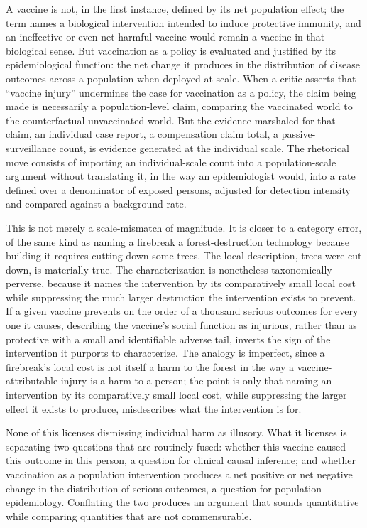 \documentclass[11pt]{article}
\begin{document}
A vaccine is not, in the first instance, defined by its net population effect; the term names a biological intervention intended to induce protective immunity, and an ineffective or even net-harmful vaccine would remain a vaccine in that biological sense. But vaccination as a policy is evaluated and justified by its epidemiological function: the net change it produces in the distribution of disease outcomes across a population when deployed at scale. When a critic asserts that ``vaccine injury'' undermines the case for vaccination as a policy, the claim being made is necessarily a population-level claim, comparing the vaccinated world to the counterfactual unvaccinated world. But the evidence marshaled for that claim, an individual case report, a compensation claim total, a passive-surveillance count, is evidence generated at the individual scale. The rhetorical move consists of importing an individual-scale count into a population-scale argument without translating it, in the way an epidemiologist would, into a rate defined over a denominator of exposed persons, adjusted for detection intensity and compared against a background rate.

This is not merely a scale-mismatch of magnitude. It is closer to a category error, of the same kind as naming a firebreak a forest-destruction technology because building it requires cutting down some trees. The local description, trees were cut down, is materially true. The characterization is nonetheless taxonomically perverse, because it names the intervention by its comparatively small local cost while suppressing the much larger destruction the intervention exists to prevent. If a given vaccine prevents on the order of a thousand serious outcomes for every one it causes, describing the vaccine's social function as injurious, rather than as protective with a small and identifiable adverse tail, inverts the sign of the intervention it purports to characterize. The analogy is imperfect, since a firebreak's local cost is not itself a harm to the forest in the way a vaccine-attributable injury is a harm to a person; the point is only that naming an intervention by its comparatively small local cost, while suppressing the larger effect it exists to produce, misdescribes what the intervention is for.

None of this licenses dismissing individual harm as illusory. What it licenses is separating two questions that are routinely fused: whether this vaccine caused this outcome in this person, a question for clinical causal inference; and whether vaccination as a population intervention produces a net positive or net negative change in the distribution of serious outcomes, a question for population epidemiology. Conflating the two produces an argument that sounds quantitative while comparing quantities that are not commensurable.
\end{document}
